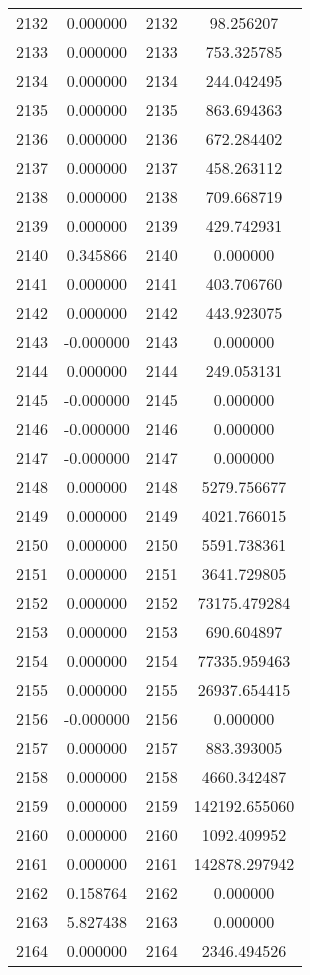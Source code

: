 \documentclass[12pt]{article}
\begin{document}
\begin{longtable}{@{}cccc@{}}
2132 & 0.000000 & 2132 & 98.256207 \\
2133 & 0.000000 & 2133 & 753.325785 \\
2134 & 0.000000 & 2134 & 244.042495 \\
2135 & 0.000000 & 2135 & 863.694363 \\
2136 & 0.000000 & 2136 & 672.284402 \\
2137 & 0.000000 & 2137 & 458.263112 \\
2138 & 0.000000 & 2138 & 709.668719 \\
2139 & 0.000000 & 2139 & 429.742931 \\
2140 & 0.345866 & 2140 & 0.000000 \\
2141 & 0.000000 & 2141 & 403.706760 \\
2142 & 0.000000 & 2142 & 443.923075 \\
2143 & -0.000000 & 2143 & 0.000000 \\
2144 & 0.000000 & 2144 & 249.053131 \\
2145 & -0.000000 & 2145 & 0.000000 \\
2146 & -0.000000 & 2146 & 0.000000 \\
2147 & -0.000000 & 2147 & 0.000000 \\
2148 & 0.000000 & 2148 & 5279.756677 \\
2149 & 0.000000 & 2149 & 4021.766015 \\
2150 & 0.000000 & 2150 & 5591.738361 \\
2151 & 0.000000 & 2151 & 3641.729805 \\
2152 & 0.000000 & 2152 & 73175.479284 \\
2153 & 0.000000 & 2153 & 690.604897 \\
2154 & 0.000000 & 2154 & 77335.959463 \\
2155 & 0.000000 & 2155 & 26937.654415 \\
2156 & -0.000000 & 2156 & 0.000000 \\
2157 & 0.000000 & 2157 & 883.393005 \\
2158 & 0.000000 & 2158 & 4660.342487 \\
2159 & 0.000000 & 2159 & 142192.655060 \\
2160 & 0.000000 & 2160 & 1092.409952 \\
2161 & 0.000000 & 2161 & 142878.297942 \\
2162 & 0.158764 & 2162 & 0.000000 \\
2163 & 5.827438 & 2163 & 0.000000 \\
2164 & 0.000000 & 2164 & 2346.494526 \\

\end{longtable}
\end{document}
